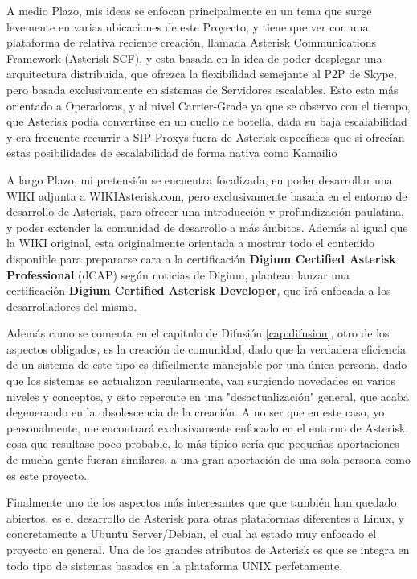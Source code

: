A medio Plazo, mis ideas se enfocan principalmente en un tema que surge levemente en varias ubicaciones de este Proyecto, y tiene que ver con una plataforma de relativa reciente creación, llamada Asterisk Communications Framework (Asterisk SCF), y esta basada en la idea de poder desplegar una arquitectura distribuida, que ofrezca la flexibilidad semejante al P2P de Skype, pero basada exclusivamente en sistemas de Servidores escalables. Esto esta más orientado a Operadoras, y al nivel Carrier-Grade \cite{website:carriergrade} ya que se observo con el tiempo, que Asterisk podía convertirse en un cuello de botella, dada su baja escalabilidad y era frecuente recurrir a SIP Proxys \cite{goncalves10} fuera de Asterisk específicos que si ofrecían estas posibilidades de escalabilidad de forma nativa como Kamailio \cite{website:kamailio}

A largo Plazo, mi pretensión se encuentra focalizada, en poder desarrollar una WIKI adjunta a WIKIAsterisk.com, pero exclusivamente basada en el entorno de desarrollo de Asterisk, para ofrecer una introducción y profundización paulatina, y poder extender la comunidad de desarrollo a más ámbitos. Además al igual que la WIKI original, esta originalmente orientada a mostrar todo el contenido disponible para prepararse cara a la certificación \textbf{Digium Certified Asterisk Professional} (dCAP) según noticias de Digium, plantean lanzar una certificación \textbf{Digium Certified Asterisk Developer}, que irá enfocada a los desarrolladores del mismo.

Además como se comenta en el capitulo de Difusión \ref{cap:difusion}, otro de los aspectos obligados, es la creación de comunidad, dado que la verdadera eficiencia de un sistema de este tipo es difícilmente manejable por una única persona, dado que los sistemas se actualizan regularmente, van surgiendo novedades en varios niveles y conceptos, y esto repercute en una "desactualización" general, que acaba degenerando en la obsolescencia de la creación. A no ser que en este caso, yo personalmente, me encontrará exclusivamente enfocado en el entorno de Asterisk, cosa que resultase poco probable, lo más típico sería que pequeñas aportaciones de mucha gente fueran similares, a una gran aportación de una sola persona como es este proyecto.

Finalmente uno de los aspectos más interesantes que que también han quedado abiertos, es el desarrollo de Asterisk para otras plataformas diferentes a Linux, y concretamente a Ubuntu Server/Debian, el cual ha estado muy enfocado el proyecto en general. Una de los grandes atributos de Asterisk es que se integra en todo tipo de sistemas basados en la plataforma UNIX perfetamente.